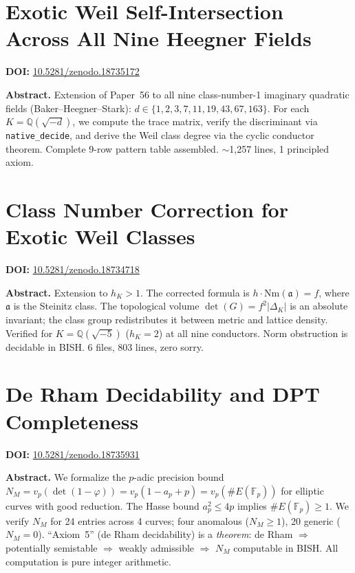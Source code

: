 \documentclass[11pt,a4paper]{article}
\begin{document}
\section{Exotic Weil Self-Intersection Across All Nine Heegner Fields}
\label{sec:p57}
\textbf{DOI:} \href{https://doi.org/10.5281/zenodo.18735172}{10.5281/zenodo.18735172}

\bigskip
\noindent\textbf{Abstract.}
Extension of Paper~56 to all nine class-number-1 imaginary quadratic fields (Baker--Heegner--Stark): $d\in\{1,2,3,7,11,19,43,67,163\}$. For each $K=\mathbb{Q}(\sqrt{-d})$, we compute the trace matrix, verify the discriminant via \texttt{native\_decide}, and derive the Weil class degree via the cyclic conductor theorem. Complete 9-row pattern table assembled. $\sim$1,257 lines, 1 principled axiom.

\section{Class Number Correction for Exotic Weil Classes}
\label{sec:p58}
\textbf{DOI:} \href{https://doi.org/10.5281/zenodo.18734718}{10.5281/zenodo.18734718}

\bigskip
\noindent\textbf{Abstract.}
Extension to $h_K>1$. The corrected formula is $h\cdot\mathrm{Nm}(\mathfrak{a})=f$, where $\mathfrak{a}$ is the Steinitz class. The topological volume $\det(G)=f^2|\Delta_K|$ is an absolute invariant; the class group redistributes it between metric and lattice density. Verified for $K=\mathbb{Q}(\sqrt{-5})$ ($h_K=2$) at all nine conductors. Norm obstruction is decidable in BISH. 6 files, 803 lines, zero sorry.

\section{De Rham Decidability and DPT Completeness}
\label{sec:p59}
\textbf{DOI:} \href{https://doi.org/10.5281/zenodo.18735931}{10.5281/zenodo.18735931}

\bigskip
\noindent\textbf{Abstract.}
We formalize the $p$-adic precision bound $N_M=v_p(\det(1-\varphi))=v_p(1-a_p+p)=v_p(\#E(\mathbb{F}_p))$ for elliptic curves with good reduction. The Hasse bound $a_p^2\le4p$ implies $\#E(\mathbb{F}_p)\ge1$. We verify $N_M$ for 24 entries across 4 curves; four anomalous ($N_M\ge1$), 20 generic ($N_M=0$). ``Axiom~5'' (de Rham decidability) is a \emph{theorem}: de Rham $\Rightarrow$ potentially semistable $\Rightarrow$ weakly admissible $\Rightarrow$ $N_M$ computable in BISH. All computation is pure integer arithmetic.
\end{document}
